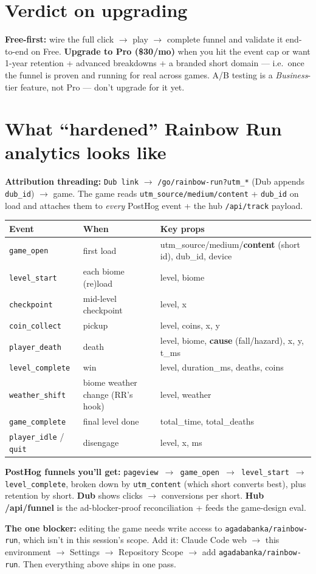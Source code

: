 \documentclass[11pt]{article}
\newcommand{\callout}[1]{\par\medskip\noindent
  \colorbox{soft}{\parbox{\dimexpr\linewidth-2\fboxsep\relax}{\color{ink}#1}}\par\medskip}
\begin{document}
\section{Verdict on upgrading}
\textbf{Free-first:} wire the full click $\to$ play $\to$ complete funnel and validate it
end-to-end on Free. \textbf{Upgrade to Pro (\$30/mo)} when you hit the event cap or want
1-year retention + advanced breakdowns + a branded short domain --- i.e.\ once the funnel is
proven and running for real across games. A/B testing is a \emph{Business}-tier feature, not
Pro --- don't upgrade for it yet.

\section{What ``hardened'' Rainbow Run analytics looks like}
\textbf{Attribution threading:} \texttt{Dub link} $\to$ \texttt{/go/rainbow-run?utm\_*}
(Dub appends \texttt{dub\_id}) $\to$ game. The game reads \texttt{utm\_source/medium/content}
+ \texttt{dub\_id} on load and attaches them to \emph{every} PostHog event + the hub
\texttt{/api/track} payload.

\begin{center}\small
\begin{tabular}{@{}P{3.0cm}P{4.0cm}P{7.0cm}@{}}
\toprule
Event & When & Key props \\
\midrule
\texttt{game\_open} & first load & utm\_source/medium/\textbf{content} (short id), dub\_id, device \\
\texttt{level\_start} & each biome (re)load & level, biome \\
\texttt{checkpoint} & mid-level checkpoint & level, x \\
\texttt{coin\_collect} & pickup & level, coins, x, y \\
\texttt{player\_death} & death & level, biome, \textbf{cause} (fall/hazard), x, y, t\_ms \\
\texttt{level\_complete} & win & level, duration\_ms, deaths, coins \\
\texttt{weather\_shift} & biome weather change (RR's hook) & level, weather \\
\texttt{game\_complete} & final level done & total\_time, total\_deaths \\
\texttt{player\_idle} / \texttt{quit} & disengage & level, x, ms \\
\bottomrule
\end{tabular}
\end{center}

\noindent\textbf{PostHog funnels you'll get:} \texttt{pageview $\to$ game\_open $\to$ level\_start
$\to$ level\_complete}, broken down by \texttt{utm\_content} (which short converts best), plus
retention by short. \textbf{Dub} shows clicks $\to$ conversions per short. \textbf{Hub
/api/funnel} is the ad-blocker-proof reconciliation + feeds the game-design eval.

\callout{\textbf{The one blocker:} editing the game needs write access to
\texttt{agadabanka/rainbow-run}, which isn't in this session's scope. Add it: Claude Code web
$\to$ this environment $\to$ Settings $\to$ Repository Scope $\to$ add
\texttt{agadabanka/rainbow-run}. Then everything above ships in one pass.}
\end{document}

